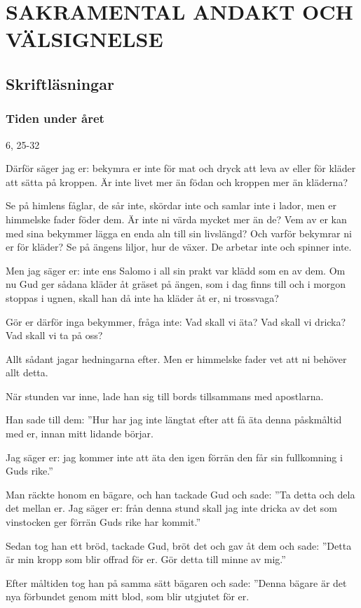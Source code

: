 \chapter{SAKRAMENTAL ANDAKT OCH VÄLSIGNELSE}

\section{Skriftläsningar}

\subsection{Tiden under året}

{6, 25-32}
{Därför säger jag er:  bekymra er inte för mat och dryck att leva av eller för kläder att sätta på kroppen. Är inte livet mer än födan och kroppen mer än kläderna?

Se på himlens fåglar, de sår inte, skördar inte och samlar inte i lador, men er himmelske fader föder dem. Är inte ni värda mycket mer än de?
Vem av er kan med sina bekymmer lägga en enda aln till sin livslängd?
Och varför bekymrar ni er för kläder? Se på ängens liljor, hur de växer. De arbetar inte och spinner inte.

Men jag säger er: inte ens Salomo i all sin prakt var klädd som en av dem.
Om nu Gud ger sådana kläder åt gräset på ängen, som i dag finns till och i morgon stoppas i ugnen, skall han då inte ha kläder åt er, ni trossvaga?

Gör er därför inga bekymmer, fråga inte: Vad skall vi äta? Vad skall vi dricka? Vad skall vi ta på oss?

Allt sådant jagar hedningarna efter. Men er himmelske fader vet att ni behöver allt detta.}


{När stunden var inne, lade han sig till bords tillsammans med apostlarna.

Han sade till dem: 
”Hur har jag inte längtat efter att få äta denna påskmåltid med er, innan mitt lidande börjar.

Jag säger er: jag kommer inte att äta den igen förrän den får sin fullkomning i Guds rike.”

Man räckte honom en bägare, och han tackade Gud och sade: 
”Ta detta och dela det mellan er.
Jag säger er: från denna stund skall jag inte dricka av det som vinstocken ger förrän Guds rike har kommit.”

Sedan tog han ett bröd, tackade Gud, bröt det och gav åt dem och sade: 
”Detta är min kropp som blir offrad för er. Gör detta till minne av mig.”

Efter måltiden tog han på samma sätt bägaren och sade: 
”Denna bägare är det nya förbundet genom mitt blod, som blir utgjutet för er.}
 
